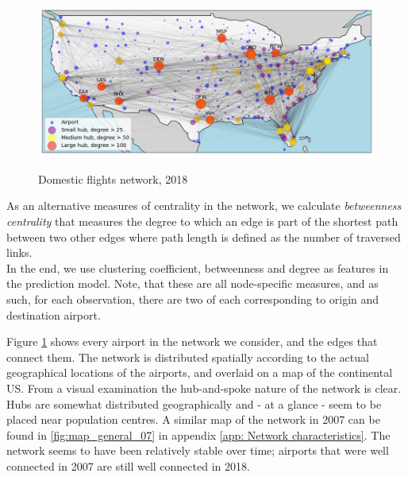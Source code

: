 \begin{figure}[H]
  \centering
  \caption{Domestic flights network, 2018}
    \includegraphics[width=1. \textwidth]{Exam/Figures/map_general_18}
    \vspace{-0.7cm}
  \label{fig:map_general_18}
\end{figure}
As an alternative measures of centrality in the network, we calculate \textit{betweenness centrality} that measures the degree to which an edge is part of the shortest path between two other edges where path length is defined as the number of traversed links. \\
In the end, we use clustering coefficient, betweenness and degree as features in the prediction model. Note, that these are all node-specific measures, and as such, for each observation, there are two of each corresponding to origin and destination airport. 

Figure \ref{fig:map_general_18} shows every airport in the network we consider, and the edges that connect them. The network is distributed spatially according to the actual geographical locations of the airports, and overlaid on a map of the continental US. From a visual examination the hub-and-spoke nature of the network is clear. Hubs are somewhat distributed geographically and - at a glance - seem to be placed near population centres. A similar map of the network in 2007 can be found in \ref{fig:map_general_07} in appendix \ref{app: Network characteristics}. The network seems to have been relatively stable over time; airports that were well connected in 2007 are still well connected in 2018. 

